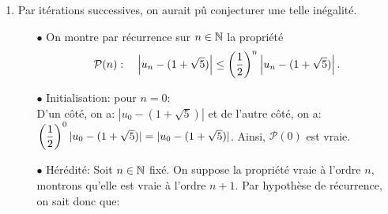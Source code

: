 \documentclass[a4paper, 11pt,reqno]{article}
\begin{document}
\begin{correction}
\begin{enumerate}
\begin{itemize}
		      \end{itemize}
		      Ainsi, d'apr\`es le th\'eor\`eme des accroissements finis, il existe $c$ compris entre $u_n$ et $1+\sqrt{5}$ tel que
		      $$f(u_n)-f(1+\sqrt{5})=(u_n-(1+\sqrt{5}))\times f^{\prime}(c).$$
		      En passant \`a la valeur absolue, on obtient que
		      $$\left| u_{n+1}-f(1+\sqrt{5}) \right|=\left| f^{\prime}(c) \right|\times \left| u_n- (1+\sqrt{5})\right|.$$
		      On remarque de plus que:
		      $$f^2(1+\sqrt{5})=2+2\sqrt{5}+4=6+2\sqrt{5}\qquad \hbox{et}\qquad (1+\sqrt{5})^2=1+5+2\sqrt{5}=6+\sqrt{5}.$$
		      Ainsi, comme la fonction $f$ est \`a valeurs positives, on a: $f^2(1+\sqrt{5})=(1+\sqrt{5})^2$ implique que $f(1+\sqrt{5})=1+\sqrt{5}$. Et le nombre $1+\sqrt{5}$ est bien point fixe de la fonction $f$. On obtient donc
		      $$\left| u_{n+1}-(1+\sqrt{5}) \right|=\left| f^{\prime}(c) \right|\times \left| u_n- (1+\sqrt{5})\right|.$$
		      Il reste alors \`a borner le terme avec la d\'eriv\'ee.\\
		      \noindent Or on a: $f^{\prime}(c)=\ddp\frac{2}{2\sqrt{2c+4}}=\ddp\frac{1}{\sqrt{2c+4}}$. On remarque que, comme $c>0$ (car $c$ est compris entre $u_n$ et $1+\sqrt{5}$ qui sont des nombres tous les deux positifs), on a: $2c+4>4$ et la racine carr\'ee \'etant strictement croissante sur $\R^{+}$, on a: $\sqrt{2c+4}>\sqrt{4}$ \`a savoir $\sqrt{2c+4}>2$. Puis la fonction inverse \'etant strictement d\'ecroissante sur $\R^{+\star}$, on a: $\ddp\frac{1}{\sqrt{2c+4}}\leq \ddp\demi$. Ainsi, comme $\left| u_n-(1+\sqrt{5})\right|\geq 0$, on obtient que:
		      $$|f^{\prime}(c)|\left| u_n-\alpha\right| \leq \ddp\demi\left|  u_n-\alpha\right|\Leftrightarrow \left| u_{n+1}-\alpha\right| \leq \ddp\demi \left| u_n-\alpha\right| $$
		      en posant $\alpha=1+\sqrt{5}$.
		\item Par it\'erations successives, on aurait p\^u conjecturer une telle in\'egalit\'e.
		      \begin{itemize}
			      \item[$\bullet$] On montre par r\'ecurrence sur $n\in\mathbb{N}$ la propri\'et\'e
			            $$\mathcal{P}(n):\quad \left| u_n-(1+\sqrt{5})\right| \leq \left( \displaystyle\frac{1}{2}\right)^n \left| u_n-(1+\sqrt{5})\right|.$$
			      \item[$\bullet$]  Initialisation: pour $n=0$:\\
			            \noindent D'un c\^ot\'e, on a: $|u_0-(1+\sqrt{5})|$ et de l'autre c\^ot\'e, on a: $\left(\displaystyle\frac{1}{2}\right)^0 |u_0-(1+\sqrt{5})|= |u_0-(1+\sqrt{5})| $. Ainsi, $\mathcal{P}(0)$ est vraie.
			      \item[$\bullet$]  H\'er\'edit\'e: Soit $n\in \mathbb{N}$ fix\'e. On suppose la propri\'et\'e vraie \`a l'ordre $n$, montrons qu'elle est vraie \`a l'ordre $n+1$. Par hypoth\`ese de r\'ecurrence, on sait donc que:

\end{itemize}
\end{enumerate}
\end{correction}
\end{document}
